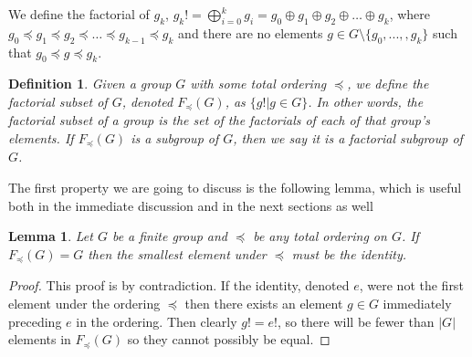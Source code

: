 \documentclass{article}
\newtheorem{lemma}{Lemma}
\newtheorem{definition}{Definition}
\begin{document}
We define the factorial of $g_k$, $g_k! = \bigoplus_{i=0}^{k} g_i = g_0 \oplus g_1 \oplus g_2 \oplus \ldots \oplus g_k$, where $g_0\preceq g_1\preceq g_2 \preceq \ldots \preceq g_{k-1} \preceq g_k$ and there are no elements $g\in G\setminus\{g_0,...,,g_k\}$ such that $g_0\preceq g\preceq g_k$.
\begin{definition}
Given a group $G$ with some total ordering $\preceq$, we define the \textit{factorial subset} of $G$, denoted $F_\preceq(G)$, as $\{g! | g \in G\}$. In other words, the factorial subset of a group is the set of the factorials of each of that group's elements. If $F_\preceq(G)$ is a subgroup of $G$, then we say it is a \textit{factorial subgroup} of $G$. 
\end{definition}


The first property we are going to discuss is the following lemma, which is useful both in the immediate discussion and in the next sections as well

\begin{lemma}\label{first_element_id} Let $G$ be a finite group and $\preceq$ be any total ordering on $G$. If $F_\preceq(G) = G$ then the smallest element under $\preceq$ must be the identity.
\end{lemma}

\begin{proof} This proof is by contradiction. If the identity, denoted $e$, were not the first element under the ordering $\preceq$  then there exists an element $g\in G$ immediately preceding $e$ in the ordering. Then clearly $g!=e!$, so there will be fewer than $|G|$ elements in $F_\preceq(G)$ so they cannot possibly be equal.

\end{proof}
\end{document}
